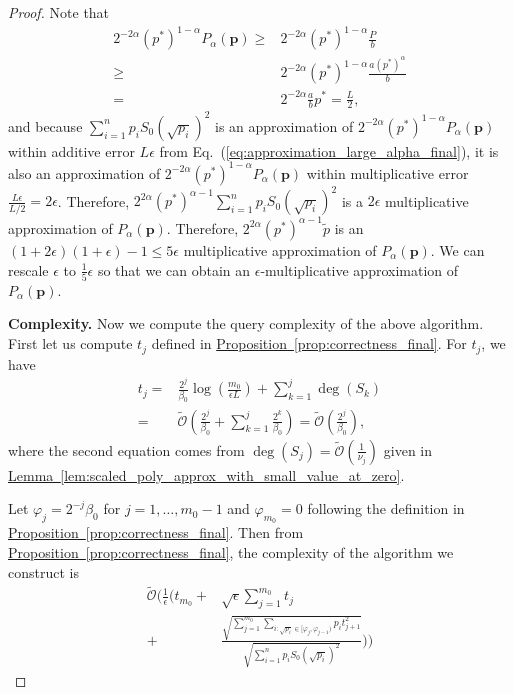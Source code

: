 \documentclass[journal]{IEEEtran}
\newcommand{\eq}[1]{Eq.~(\ref{eq:#1})}
\newcommand{\lem}[1]{\hyperref[lem:#1]{Lemma~\ref*{lem:#1}}}
\newcommand{\prop}[1]{\hyperref[prop:#1]{Proposition~\ref*{prop:#1}}}
\begin{document}
\begin{proof}
    Note that \begin{align}
        2^{-2\alpha}(p^*)^{1-\alpha}P_{\alpha}(\mathbf{p}) \nonumber  \ge & 2^{-2\alpha}(p^*)^{1-\alpha}\frac{P}{b} \nonumber \\ \ge& 2^{-2\alpha}(p^*)^{1-\alpha}\frac{a(p^*)^{\alpha}}{b}\nonumber \\ = & 2^{-2\alpha}\frac{a}{b}p^* =\frac{L}{2},
    \end{align}
    and because $\sum_{i=1}^n p_iS_0(\sqrt{p_i})^2$ is an approximation of $2^{-2\alpha}(p^*)^{1-\alpha}P_{\alpha}(\mathbf{p})$ within additive error $L\epsilon$ from \eq{approximation_large_alpha_final}, it is also an approximation of $2^{-2\alpha}(p^*)^{1-\alpha}P_{\alpha}(\mathbf{p})$ within multiplicative error $\frac{L\epsilon}{L/2} = 2\epsilon$. Therefore, $2^{2\alpha}(p^*)^{\alpha-1}\sum_{i=1}^n p_iS_0(\sqrt{p_i})^2$ is a $2\epsilon$ multiplicative approximation of $P_{\alpha}(\mathbf{p})$. Therefore, $2^{2\alpha}(p^*)^{\alpha-1}\tilde{p}$ is an $(1+2\epsilon)(1+\epsilon)-1\le 5\epsilon$ multiplicative approximation of $P_{\alpha}(\mathbf{p})$. We can rescale $\epsilon$ to $\frac{1}{5}\epsilon$ so that we can obtain an $\epsilon$-multiplicative approximation of $P_{\alpha}(\mathbf{p})$. 
    
    \vspace{3mm}
    \noindent
    \textbf{Complexity.}
    Now we compute the query complexity of the above algorithm. 
    First let us compute $t_j$ defined in \prop{correctness_final}. For $t_j$, we have
    \begin{align}
        t_j = &\frac{2^{j}}{\beta_0}\log(\frac{m_0}{\epsilon L}) + \sum_{k = 1}^{j}\deg(S_k)\nonumber\\
        =&\widetilde{\mathcal{O}}\left(\frac{2^j}{\beta_0} + \sum_{k = 1}^{j} \frac{2^k}{\beta_0}\right)= \widetilde{\mathcal{O}}\left(\frac{2^j}{\beta_0}\right),
    \end{align}
    where the second equation comes from $\deg(S_j) = \widetilde{\mathcal{O}}\left(\frac{1}{\nu_j}\right)$ given in \lem{scaled_poly_approx_with_small_value_at_zero}.

Let $\varphi_j = 2^{-j}\beta_0$ for $j = 1,\ldots,m_0-1$ and $\varphi_{m_0}=0$ following the definition in \prop{correctness_final}. Then from \prop{correctness_final}, the complexity of the algorithm we construct is
\begin{align}
  \label{eq:complexity_final_first}
    \widetilde{\mathcal{O}}\biggl(\frac{1}{\epsilon}\biggl(t_{m_0} +& \sqrt{\epsilon} \sum_{j=1}^{m_0} t_j \nonumber\\+& \frac{\sqrt{\sum_{j = 1}^{m_0}\sum_{i:\sqrt{p_i}\in[\varphi_{j},\varphi_{j-1})}p_i t_{j+1}^2}}{\sqrt{\sum_{i = 1}^np_iS_0(\sqrt{p_i})^2}} \biggr)\biggr) 
\end{align}


\end{proof}
\end{document}

